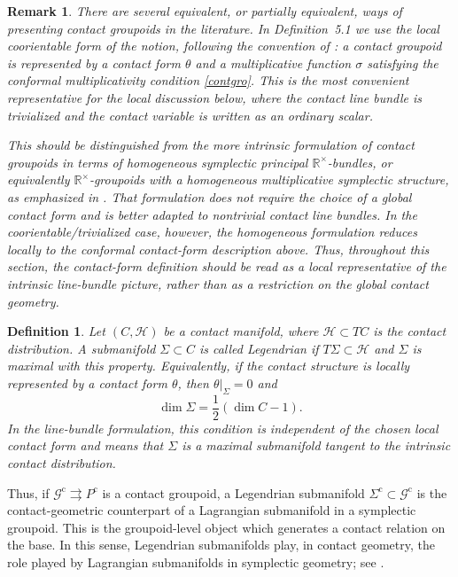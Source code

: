 \documentclass[11pt]{article}
\newtheorem{definition}[theorem]{Definition}
\newtheorem{remark}[theorem]{Remark}
\begin{document}
\begin{remark}
There are several equivalent, or partially equivalent, ways of presenting
contact groupoids in the literature. In Definition~5.1 we use the local
coorientable form of the notion, following the convention of
\cite{IglesiasMarrero2003}: a contact groupoid is represented by a contact form
\(\theta\) and a multiplicative function \(\sigma\) satisfying the conformal
multiplicativity condition \eqref{contgro}. This is the most convenient representative for the local discussion below,
where the contact line bundle is trivialized and the contact variable is written
as an ordinary scalar.

This should be distinguished from the more intrinsic formulation of contact
groupoids in terms of homogeneous symplectic principal
\(\mathbb R^\times\)-bundles, or equivalently \(\mathbb R^\times\)-groupoids
with a homogeneous multiplicative symplectic structure, as emphasized in
\cite{BGG2017}. That formulation does not require the choice of a global contact
form and is better adapted to nontrivial contact line bundles. In the
coorientable/trivialized case, however, the homogeneous formulation reduces
locally to the conformal contact-form description above. Thus, throughout this
section, the contact-form definition should be read as a local representative of
the intrinsic line-bundle picture, rather than as a restriction on the global
contact geometry.
\end{remark}

\begin{definition}
Let \((C,\mathcal H)\) be a contact manifold, where
\(\mathcal H\subset TC\) is the contact distribution. A submanifold
\(\Sigma\subset C\) is called \emph{Legendrian} if
$T\Sigma\subset \mathcal H$ and \(\Sigma\) is maximal with this property. Equivalently, if the contact
structure is locally represented by a contact form \(\theta\), then $\theta|_{\Sigma}=0$ and
\[
\dim \Sigma=\frac{1}{2}(\dim C-1).
\]
In the line-bundle formulation, this condition is independent of the chosen
local contact form and means that \(\Sigma\) is a maximal submanifold tangent to
the intrinsic contact distribution.
\end{definition}



Thus, if $\mathcal G^{\mathrm c}\rightrightarrows P^{\mathrm c}$ is a contact groupoid, a Legendrian submanifold $\Sigma^{\mathrm c}\subset \mathcal G^{\mathrm c}$ is the contact-geometric counterpart of a Lagrangian submanifold in a symplectic
groupoid. This is the groupoid-level object which generates a contact relation
on the base. In this sense, Legendrian submanifolds play, in contact geometry,
the role played by Lagrangian submanifolds in symplectic geometry; see
\cite{Geiges2008,EsenLainzDeLeonMarrero2021}.
\end{document}
